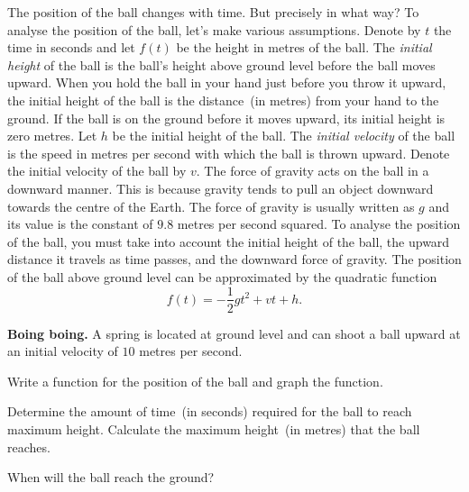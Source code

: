 \documentclass[a4paper,oneside,12pt]{article}
\begin{document}
The position of the ball changes with time.  But precisely in what
way?  To analyse the position of the ball, let's make various
assumptions.  Denote by $t$ the time in seconds and let $f(t)$ be the
height in metres of the ball.  The \emph{initial height} of the ball
is the ball's height above ground level before the ball moves upward.
When you hold the ball in your hand just before you throw it upward,
the initial height of the ball is the distance~(in metres) from your
hand to the ground.  If the ball is on the ground before it moves
upward, its initial height is zero metres.  Let $h$ be the initial
height of the ball.  The \emph{initial velocity} of the ball is the
speed in metres per second with which the ball is thrown upward.
Denote the initial velocity of the ball by $v$.  The force of gravity
acts on the ball in a downward manner.  This is because gravity tends
to pull an object downward towards the centre of the Earth.  The force
of gravity is usually written as $g$ and its value is the constant of
$9.8$ metres per second squared.  To analyse the position of the ball,
you must take into account the initial height of the ball, the upward
distance it travels as time passes, and the downward force of gravity.
The position of the ball above ground level can be approximated by the
quadratic function
\begin{equation}
\label{eqn:position_of_object_under_free_fall}
f(t)
=
-\frac{1}{2} gt^2 + vt + h.
\end{equation}

\begin{example}
\label{ex:spring_ball}
\textbf{Boing boing.}
A spring is located at ground level and can shoot a ball upward at an
initial velocity of $10$ metres per second.
\begin{packedenum}
\item\label{ex:spring_ball_graph}
  Write a function for the position of the ball and graph the
  function.

\item\label{ex:spring_ball_time_to_maximum_height}
  Determine the amount of time~(in seconds) required for the ball to
  reach maximum height.  Calculate the maximum height~(in metres) that
  the ball reaches.

\item\label{ex:spring_ball_time_hit_ground}
  When will the ball reach the ground?
\end{packedenum}
\end{example}
\end{document}
